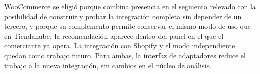 WooCommerce se eligió porque combina presencia en el segmento relevado con la posibilidad de construir y probar la integración completa sin depender de un tercero, y porque su complemento permite conservar el mismo modo de uso que en Tiendanube: la recomendación aparece dentro del panel en el que el comerciante ya opera. La integración con Shopify y el modo independiente quedan como trabajo futuro. Para ambas, la interfaz de adaptadores reduce el trabajo a la nueva integración, sin cambios en el núcleo de análisis.

